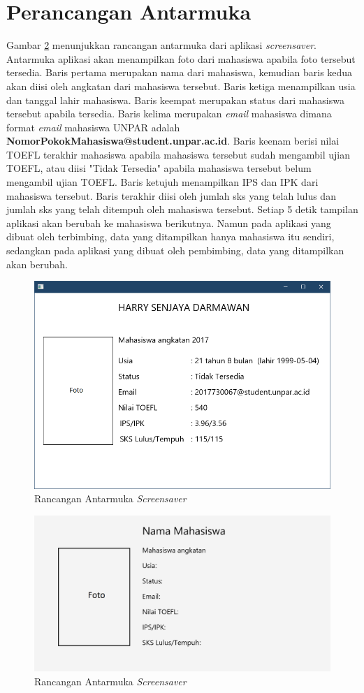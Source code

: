 \section{Perancangan Antarmuka}
Gambar \ref{fig:4_antarmuka} menunjukkan rancangan antarmuka dari aplikasi \textit{screensaver}. Antarmuka aplikasi akan menampilkan foto dari mahasiswa apabila foto tersebut tersedia. Baris pertama merupakan nama dari mahasiswa, kemudian baris kedua akan diisi oleh angkatan dari mahasiswa tersebut. Baris ketiga menampilkan usia dan tanggal lahir mahasiswa. Baris keempat merupakan status dari mahasiswa tersebut apabila tersedia. Baris kelima merupakan \textit{email} mahasiswa dimana format \textit{email} mahasiswa UNPAR adalah \textbf{NomorPokokMahasiswa@student.unpar.ac.id}. Baris keenam berisi nilai TOEFL terakhir mahasiswa apabila mahasiswa tersebut sudah mengambil ujian TOEFL, atau diisi "Tidak Tersedia" apabila mahasiswa tersebut belum mengambil ujian TOEFL. Baris ketujuh menampilkan IPS dan IPK dari mahasiswa tersebut. Baris terakhir diisi oleh jumlah sks yang telah lulus dan jumlah sks yang telah ditempuh oleh mahasiswa tersebut. Setiap 5 detik tampilan aplikasi akan berubah ke mahasiswa berikutnya. Namun pada aplikasi yang dibuat oleh terbimbing, data yang ditampilkan hanya mahasiswa itu sendiri, sedangkan pada aplikasi yang dibuat oleh pembimbing, data yang ditampilkan akan berubah.
\begin{figure}[H]
	\centering
	\includegraphics[scale=0.5]{Gambar/UI.png}
	\caption{Rancangan Antarmuka \textit{Screensaver}}
	\label{fig:4_antarmuka}
\end{figure}

\begin{figure}[H]
	\centering
	\includegraphics[scale=0.2]{Gambar/UI2.png}
	\caption{Rancangan Antarmuka \textit{Screensaver}}
	\label{fig:4_antarmuka}
\end{figure}